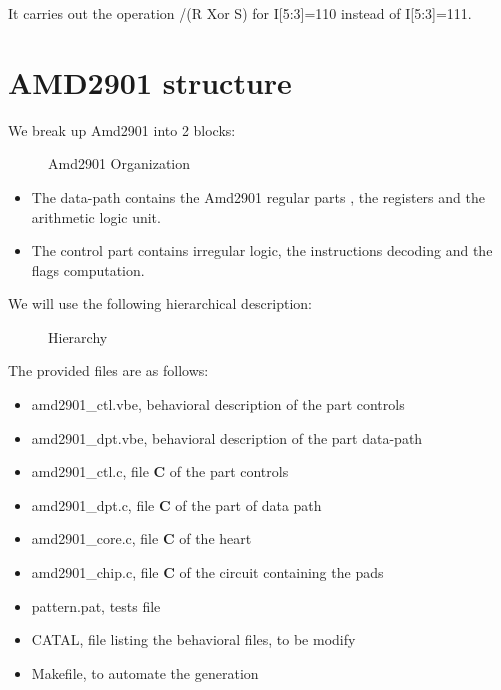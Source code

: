\documentclass[12pt]{article}
\begin{document}
{It carries out the operation /(R Xor S) for I[5:3]=110 instead of
I[5:3]=111.

\newpage
\section{AMD2901 structure}


We break up Amd2901 into 2 blocks: %
\begin{figure}[H]\center
\leavevmode \epsfxsize=10cm  \caption{Amd2901
Organization  \label{bloc}}
\end{figure}


\begin{itemize}\itemsep=-.8ex
\item The data-path contains the Amd2901 regular parts , the
registers and the arithmetic logic unit. 
\item The control part contains irregular logic, 
      the instructions decoding and the flags computation.
\end{itemize}

\newpage
We will use the following hierarchical description:
\begin{figure}[H]\center
\leavevmode
\epsfxsize=10cm
\caption{Hierarchy \label{hier}}
\end{figure}

The provided files are as follows:\\
\begin{itemize}\itemsep=-.8ex
\item amd2901\_ctl.vbe, behavioral description of the part
controls \item amd2901\_dpt.vbe, behavioral description of the
part data-path \item amd2901\_ctl.c, file { \bf C } of the part
controls \item amd2901\_dpt.c, file { \bf C } of the part of data
path \item amd2901\_core.c, file { \bf C } of the heart \item
amd2901\_chip.c, file { \bf C } of the circuit containing the pads
\item pattern.pat, tests file \item CATAL, file listing the
behavioral files, to be modify \item Makefile, to automate the
generation
\end{itemize}


}
\end{document}
